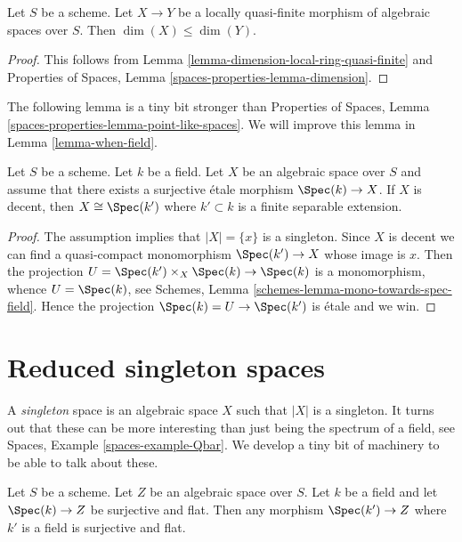 \begin{lemma}
\label{lemma-dimension-quasi-finite}
Let $S$ be a scheme. Let $X \to Y$ be a locally quasi-finite morphism
of algebraic spaces over $S$. Then $\dim(X) \leq \dim(Y)$.
\end{lemma}

\begin{proof}
This follows from Lemma \ref{lemma-dimension-local-ring-quasi-finite}
and Properties of Spaces, Lemma \ref{spaces-properties-lemma-dimension}.
\end{proof}

\noindent
The following lemma is a tiny bit stronger than
Properties of Spaces,
Lemma \ref{spaces-properties-lemma-point-like-spaces}.
We will improve this lemma in Lemma \ref{lemma-when-field}.

\begin{lemma}
\label{lemma-decent-point-like-spaces}
Let $S$ be a scheme. Let $k$ be a field. Let $X$ be an algebraic space
over $S$ and assume that there exists a surjective \'etale morphism
$\Spec(k) \to X$. If $X$ is decent, then $X \cong \Spec(k')$
where $k' \subset k$ is a finite separable extension.
\end{lemma}

\begin{proof}
The assumption implies that $|X| = \{x\}$ is a singleton. Since
$X$ is decent we can find a quasi-compact monomorphism $\Spec(k') \to X$
whose image is $x$. Then the projection
$U = \Spec(k') \times_X \Spec(k) \to \Spec(k)$
is a monomorphism, whence $U = \Spec(k)$, see
Schemes, Lemma \ref{schemes-lemma-mono-towards-spec-field}.
Hence the projection $\Spec(k) = U \to \Spec(k')$ is \'etale and
we win.
\end{proof}






\section{Reduced singleton spaces}
\label{section-singleton}

\noindent
A {\it singleton} space is an algebraic space $X$ such that $|X|$ is
a singleton. It turns out that these can be more interesting than
just being the spectrum of a field, see
Spaces, Example \ref{spaces-example-Qbar}.
We develop a tiny bit of machinery to be able to talk about these.

\begin{lemma}
\label{lemma-flat-cover-by-field}
Let $S$ be a scheme. Let $Z$ be an algebraic space over $S$.
Let $k$ be a field and let $\Spec(k) \to Z$ be surjective and flat.
Then any morphism $\Spec(k') \to Z$ where $k'$ is a field is
surjective and flat.
\end{lemma}

